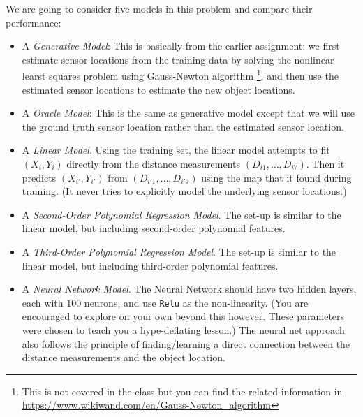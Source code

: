 \documentclass[preview]{standalone}
\begin{document}
We are going to consider five models in this problem and compare their performance:
\begin{itemize}
    \item A \emph{Generative Model}:  This is basically from the earlier
        assignment: we first estimate sensor locations from the training data
        by solving the nonlinear learst squares problem using Gauss-Newton
        algorithm \footnote{This is not covered in the class but you can find
        the related information in
        \url{https://www.wikiwand.com/en/Gauss-Newton_algorithm}}, and
        then use the estimated sensor locations to estimate the
        new object locations.
    \item A \emph{Oracle Model}:  This is the same as generative model except
        that we will use the ground truth sensor location rather than the
        estimated sensor location.
    \item A \emph{Linear Model}. Using the training set, the linear model
        attempts to fit $(X_i, Y_i)$ directly from the distance
        measurements $(D_{i1}, \ldots, D_{i7})$. Then it
        predicts $(X_{i'},Y_{i'})$ from $(D_{i'1},\ldots,D_{i'7})$
        using the map that it found during training. (It never tries
        to explicitly model the underlying sensor locations.)
    \item A \emph{Second-Order Polynomial Regression Model}. The set-up is
        similar to the linear model, but including second-order polynomial
        features.
    \item A \emph{Third-Order Polynomial Regression Model}. The set-up is
        similar to the linear model, but including third-order polynomial
        features.
    \item A \emph{Neural Network Model}. The Neural Network should have two
        hidden layers, each with $100$ neurons, and use \texttt{Relu} as the
        non-linearity. (You are encouraged to explore on your own beyond this
        however. These parameters were chosen to teach you a hype-deflating
        lesson.) The neural net approach also follows the principle of
        finding/learning a direct connection between the distance
        measurements and the object location.
\end{itemize}
\end{document}
